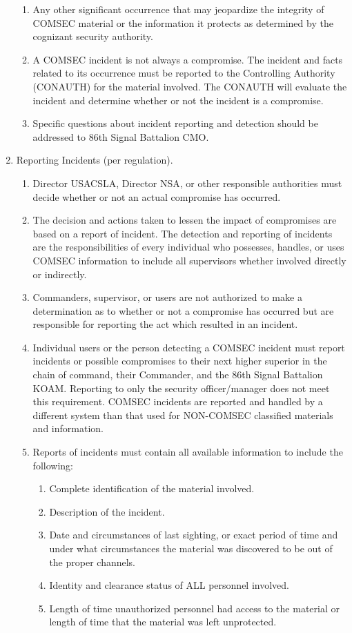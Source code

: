 \documentclass{article}
\begin{document}
\begin{enumerate}
\begin{enumerate}
\item	Any other significant occurrence that may jeopardize the integrity of COMSEC material or the information it protects as determined by the cognizant security authority. 
\item	A COMSEC incident is not always a compromise.  The incident and facts related to its occurrence must be reported to the Controlling Authority (CONAUTH) for the material involved.  The CONAUTH will evaluate the incident and determine whether or not the incident is a compromise. 
\item	Specific questions about incident reporting and detection should be addressed to 86th Signal Battalion CMO. 
\end{enumerate}
\item	Reporting Incidents (per regulation). 
\begin{enumerate}
    \item 	Director USACSLA, Director NSA, or other responsible authorities must decide whether or not an actual compromise has occurred. 
\item	The decision and actions taken to lessen the impact of compromises are based on a report of incident.  The detection and reporting of incidents are the responsibilities of every individual who possesses, handles, or uses COMSEC information to include all supervisors whether involved directly or indirectly. \item Commanders, supervisor, or users are not authorized to make a determination as to whether or not a compromise has occurred but are responsible for reporting the act which resulted in an incident.
\item	Individual users or the person detecting a COMSEC incident must report incidents or possible compromises to their next higher superior in the chain of command, their Commander, and the 86th Signal Battalion KOAM.  Reporting to only the security officer/manager does not meet this requirement.  COMSEC incidents are reported and handled by a different system than that used for NON-COMSEC classified materials and information. 
\item	Reports of incidents must contain all available information to include the following: 
\begin{enumerate}
\item	Complete identification of the material involved. 
\item	Description of the incident. 
\item	Date and circumstances of last sighting, or exact period of time and under what circumstances the material was discovered to be out of the proper channels. 
\item	Identity and clearance status of ALL personnel involved. 
\item	Length of time unauthorized personnel had access to the material or length of time that the material was left unprotected.
\end{enumerate}
\end{enumerate}
\end{enumerate}
\end{document}
